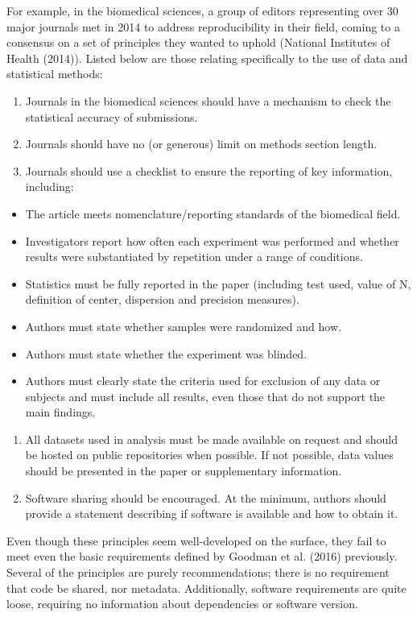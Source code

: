 \documentclass[12pt,twoside]{reedthesis}
\providecommand{\tightlist}{%
  \setlength{\itemsep}{0pt}\setlength{\parskip}{0pt}}
\begin{document}
For example, in the biomedical sciences, a group of editors representing over 30 major journals met in 2014 to address reproducibility in their field, coming to a consensus on a set of principles they wanted to uphold (National Institutes of Health (2014)). Listed below are those relating specifically to the use of data and statistical methods:
\begin{enumerate}
\def\labelenumi{\arabic{enumi})}
\item
  Journals in the biomedical sciences should have a mechanism to check the statistical accuracy of submissions.
\item
  Journals should have no (or generous) limit on methods section length.
\item
  Journals should use a checklist to ensure the reporting of key information, including:
\end{enumerate}
\begin{itemize}
\tightlist
\item
  The article meets nomenclature/reporting standards of the biomedical field.
\item
  Investigators report how often each experiment was performed and whether results were substantiated by repetition under a range of conditions.
\item
  Statistics must be fully reported in the paper (including test used, value of N, definition of center, dispersion and precision measures).
\item
  Authors must state whether samples were randomized and how.
\item
  Authors must state whether the experiment was blinded.
\item
  Authors must clearly state the criteria used for exclusion of any data or subjects and must include all results, even those that do not support the main findings.
\end{itemize}
\begin{enumerate}
\def\labelenumi{\arabic{enumi})}
\setcounter{enumi}{3}
\item
  All datasets used in analysis must be made available on request and should be hosted on public repositories when possible. If not possible, data values should be presented in the paper or supplementary information.
\item
  Software sharing should be encouraged. At the minimum, authors should provide a statement describing if software is available and how to obtain it.
\end{enumerate}
Even though these principles seem well-developed on the surface, they fail to meet even the basic requirements defined by Goodman et al. (2016) previously. Several of the principles are purely recommendations; there is no requirement that code be shared, nor metadata. Additionally, software requirements are quite loose, requiring no information about dependencies or software version.
\end{document}
